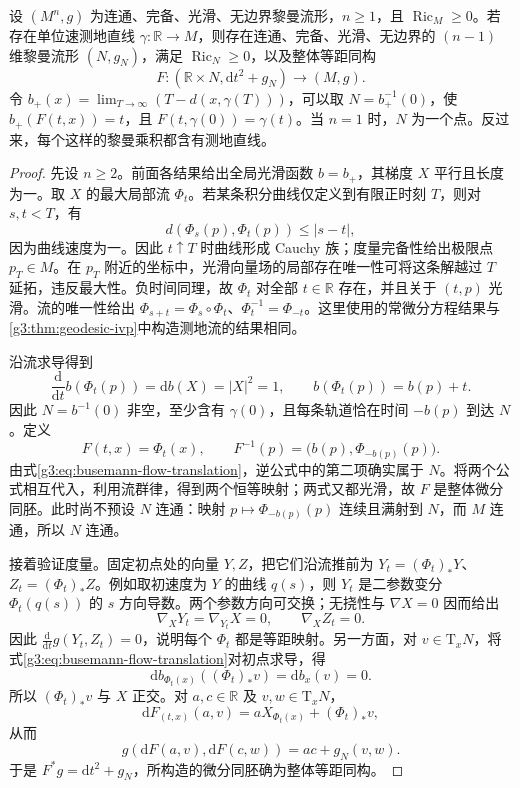 \begin{theorem}\label{g3:thm:cheeger-gromoll-splitting}
	设 \((M^n,g)\) 为连通、完备、光滑、无边界黎曼流形，\(n\ge1\)，且 \(\operatorname{Ric}_M\ge0\)。若存在单位速测地直线 \(\gamma:\mathbb R\to M\)，则存在连通、完备、光滑、无边界的 \((n-1)\) 维黎曼流形 \((N,g_N)\)，满足 \(\operatorname{Ric}_N\ge0\)，以及整体等距同构
	\[
		F:(\mathbb R\times N,\mathrm dt^2+g_N)\longrightarrow(M,g).
	\]
	令 \(b_+(x)=\lim_{T\to\infty}(T-d(x,\gamma(T)))\)，可以取 \(N=b_+^{-1}(0)\)，使 \(b_+(F(t,x))=t\)，且 \(F(t,\gamma(0))=\gamma(t)\)。当 \(n=1\) 时，\(N\) 为一个点。反过来，每个这样的黎曼乘积都含有测地直线。
\end{theorem}
\begin{proof}
	先设 \(n\ge2\)。前面各结果给出全局光滑函数 \(b=b_+\)，其梯度 \(X\) 平行且长度为一。取 \(X\) 的最大局部流 \(\Phi_t\)。若某条积分曲线仅定义到有限正时刻 \(T\)，则对 \(s,t<T\)，有
	\[
		d(\Phi_s(p),\Phi_t(p))\le|s-t|,
	\]
	因为曲线速度为一。因此 \(t\uparrow T\) 时曲线形成 Cauchy 族；度量完备性给出极限点 \(p_T\in M\)。在 \(p_T\) 附近的坐标中，光滑向量场的局部存在唯一性可将这条解越过 \(T\) 延拓，违反最大性。负时间同理，故 \(\Phi_t\) 对全部 \(t\in\mathbb R\) 存在，并且关于 \((t,p)\) 光滑。流的唯一性给出 \(\Phi_{s+t}=\Phi_s\circ\Phi_t\)、\(\Phi_t^{-1}=\Phi_{-t}\)。这里使用的常微分方程结果与\cref{g3:thm:geodesic-ivp}中构造测地流的结果相同。

	沿流求导得到
	\begin{equation}\label{g3:eq:busemann-flow-translation}
		\frac{\mathrm d}{\mathrm dt}b(\Phi_t(p))
		=\mathrm db(X)=|X|^2=1,
		\qquad b(\Phi_t(p))=b(p)+t.
	\end{equation}
	因此 \(N=b^{-1}(0)\) 非空，至少含有 \(\gamma(0)\)，且每条轨道恰在时间 \(-b(p)\) 到达 \(N\)。定义
	\begin{equation}\label{g3:eq:splitting-flow-map}
		F(t,x)=\Phi_t(x),\qquad
		F^{-1}(p)=\bigl(b(p),\Phi_{-b(p)}(p)\bigr).
	\end{equation}
	由式\eqref{g3:eq:busemann-flow-translation}，逆公式中的第二项确实属于 \(N\)。将两个公式相互代入，利用流群律，得到两个恒等映射；两式又都光滑，故 \(F\) 是整体微分同胚。此时尚不预设 \(N\) 连通：映射 \(p\mapsto\Phi_{-b(p)}(p)\) 连续且满射到 \(N\)，而 \(M\) 连通，所以 \(N\) 连通。

	接着验证度量。固定初点处的向量 \(Y,Z\)，把它们沿流推前为 \(Y_t=(\Phi_t)_*Y\)、\(Z_t=(\Phi_t)_*Z\)。例如取初速度为 \(Y\) 的曲线 \(q(s)\)，则 \(Y_t\) 是二参数变分 \(\Phi_t(q(s))\) 的 \(s\) 方向导数。两个参数方向可交换；无挠性与 \(\nabla X=0\) 因而给出
	\[
		\nabla_XY_t=\nabla_{Y_t}X=0,\qquad
		\nabla_XZ_t=0.
	\]
	因此
	\(\frac{\mathrm d}{\mathrm dt}g(Y_t,Z_t)=0\)，说明每个 \(\Phi_t\) 都是等距映射。另一方面，对 \(v\in \mathrm T_xN\)，将式\eqref{g3:eq:busemann-flow-translation}对初点求导，得
	\[
		\mathrm db_{\Phi_t(x)}((\Phi_t)_*v)=\mathrm db_x(v)=0.
	\]
	所以 \((\Phi_t)_*v\) 与 \(X\) 正交。对 \(a,c\in\mathbb R\) 及 \(v,w\in \mathrm T_xN\)，
	\[
		\mathrm dF_{(t,x)}(a,v)=aX_{\Phi_t(x)}+(\Phi_t)_*v,
	\]
	从而
	\[
		g(\mathrm dF(a,v),\mathrm dF(c,w))
		=ac+g_N(v,w).
	\]
	于是 \(F^*g=\mathrm dt^2+g_N\)，所构造的微分同胚确为整体等距同构。


\end{proof}
